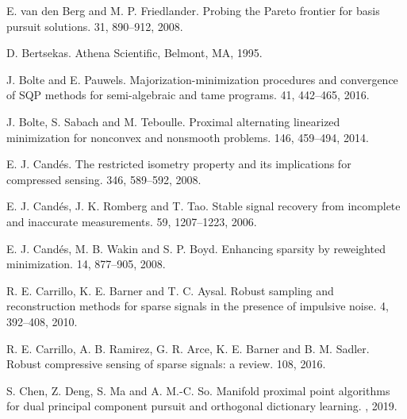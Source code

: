 \documentclass[10pt]{article}
\numberwithin{equation}{section}
\begin{document}
\begin{thebibliography}{99}
E. van den Berg and M. P. Friedlander.
\newblock Probing the Pareto frontier for basis pursuit solutions.
 31, 890--912, 2008.

D. Bertsekas.
\newblock Athena Scientific, Belmont, MA, 1995.

J. Bolte and E. Pauwels.
\newblock Majorization-minimization procedures and convergence of SQP methods for semi-algebraic and tame programs.
 41, 442--465, 2016.

J. Bolte, S. Sabach and M. Teboulle.
\newblock Proximal alternating linearized minimization for nonconvex and nonsmooth problems.
 146, 459--494, 2014.

%

E. J. Cand\'{e}s.
\newblock The restricted isometry property and its implications for compressed sensing.
 346, 589--592, 2008.

E. J. Cand\'{e}s, J. K. Romberg and T. Tao.
\newblock Stable signal recovery from incomplete and inaccurate measurements.
 59, 1207--1223, 2006.

E. J. Cand\'{e}s, M. B. Wakin and S. P. Boyd.
\newblock Enhancing sparsity by reweighted $\mathop{l_1}$ minimization.
 14, 877--905, 2008.


R. E. Carrillo, K. E. Barner and T. C. Aysal.
\newblock Robust sampling and reconstruction methods for sparse signals in the presence of impulsive noise.
 4, 392--408, 2010.

R. E. Carrillo, A. B. Ramirez, G. R. Arce, K. E. Barner and B. M. Sadler.
\newblock Robust compressive sensing of sparse signals: a review.
 108, 2016.

S. Chen, Z. Deng, S. Ma and A. M.-C. So.
\newblock Manifold proximal point algorithms for dual principal component pursuit and orthogonal dictionary learning.
, 2019.


\end{thebibliography}
\end{document}
